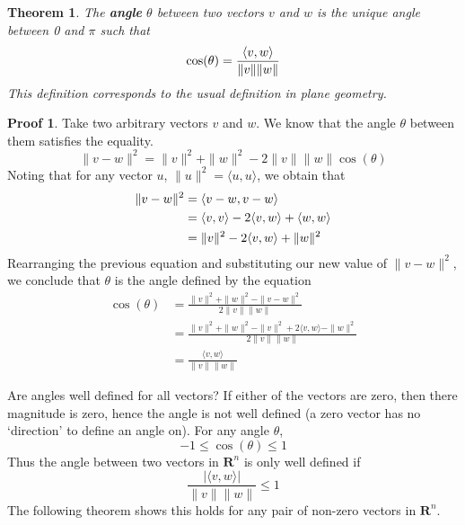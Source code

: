 \documentclass[12pt]{amsbook}
\theoremstyle{plain}
\newtheorem{theorem}{Theorem}
\theoremstyle{definition}
\newtheorem*{prf}{Proof}
\DeclarePairedDelimiter{\inner}{\langle}{\rangle}
\begin{document}
\begin{theorem}
  The {\bf angle} $\theta$ between two vectors $v$ and $w$ is the unique angle between 0 and $\pi$ such that
  \[ \cos(\theta) = \frac{\inner{v, w}}{\| v \| \| w \|} \]
  This definition corresponds to the usual definition in plane geometry.
\end{theorem}
\begin{prf}
  Take two arbitrary vectors $v$ and $w$. We know that the angle $\theta$ between them satisfies the equality.
  \[ \| v - w \|^2 = \|v\|^2 + \|w\|^2 - 2\|v\|\|w\| \cos(\theta) \]
  Noting that for any vector $u$, $\|u\|^2 = \langle u, u \rangle$, we obtain that
  \begin{align*}
    \|v - w\|^2 &= \inner{v - w, v - w}\\
                &= \inner{v, v} - 2 \inner{v, w} + \inner{w, w}\\
                &= \|v\|^2 - 2 \inner{v, w} + \|w\|^2
  \end{align*}
  Rearranging the previous equation and substituting our new value of $\|v - w\|^2$, we conclude that $\theta$ is the angle defined by the equation
  \begin{align*}
    \cos(\theta) &= \frac{\|v\|^2 + \|w\|^2 - \|v - w\|^2}{2\|v\|\|w\|}\\
                 &= \frac{\|v\|^2 + \|w\|^2 - \|v\|^2 + 2\langle v, w \rangle - \|w\|^2}{2\|v\|\|w\|}\\
                 &= \frac{\langle v, w \rangle}{\|v\|\|w\|}
  \end{align*}
\end{prf}

Are angles well defined for all vectors? If either of the vectors are zero, then there magnitude is zero, hence the angle is not well defined (a zero vector has no `direction' to define an angle on). For any angle $\theta$,
%
\[ -1 \leq \cos(\theta) \leq 1 \]
%
Thus the angle between two vectors in $\mathbf{R}^n$ is only well defined if
%
\[ \frac{|\langle v, w \rangle|}{\|v\|\|w\|} \leq 1\]
%
The following theorem shows this holds for any pair of non-zero vectors in $\mathbf{R}^n$.
\end{document}
